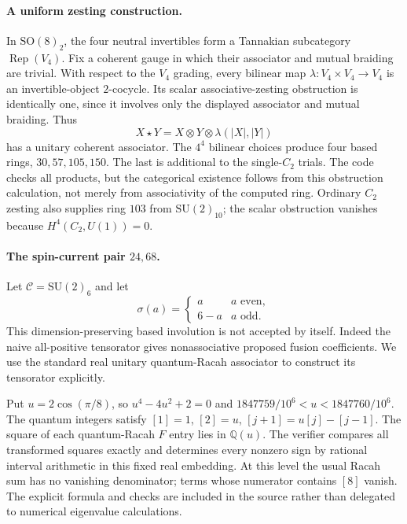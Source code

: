 \paragraph{A uniform zesting construction.}
In $\mathrm{SO}(8)_2$, the four neutral invertibles form a Tannakian
subcategory $\operatorname{Rep}(V_4)$.  Fix a coherent gauge in which
their associator and mutual braiding are trivial.  With respect to the
$V_4$ grading, every bilinear map
$\lambda:V_4\times V_4\longrightarrow V_4$ is an invertible-object
$2$-cocycle.  Its scalar associative-zesting obstruction is identically
one, since it involves only the displayed associator and mutual
braiding.  Thus
\[
 X\star Y=X\otimes Y\otimes\lambda(|X|,|Y|)
\]
has a unitary coherent associator.  The $4^4$ bilinear choices produce
four based rings, $30,57,105,150$.  The last is additional to the
single-$C_2$ trials.  The code checks all products, but the categorical
existence follows from this obstruction calculation, not merely from
associativity of the computed ring.  Ordinary $C_2$ zesting also supplies
ring $103$ from $\mathrm{SU}(2)_{10}$; the scalar obstruction vanishes
because $H^4(C_2,U(1))=0$.

\paragraph{The spin-current pair $24,68$.}
Let $\mathcal C=\mathrm{SU}(2)_6$ and let
\[
 \sigma(a)=\begin{cases}a&a\text{ even},\\6-a&a\text{ odd}.
 \end{cases}
\]
This dimension-preserving based involution is not accepted by itself.
Indeed the naive all-positive tensorator gives nonassociative proposed
fusion coefficients.  We use the standard real unitary quantum-Racah
associator to construct its tensorator explicitly.

Put $u=2\cos(\pi/8)$, so $u^4-4u^2+2=0$ and
$1847759/10^6<u<1847760/10^6$.  The quantum integers satisfy
$[1]=1$, $[2]=u$, $[j+1]=u[j]-[j-1]$.  The square of each quantum-Racah
$F$ entry lies in $\mathbb Q(u)$.  The verifier compares all transformed
squares exactly and determines every nonzero sign by rational interval
arithmetic in this fixed real embedding.  At this level the usual Racah
sum has no vanishing denominator; terms whose numerator contains
$[8]$ vanish.  The explicit formula and checks are included in the
source rather than delegated to numerical eigenvalue calculations.

